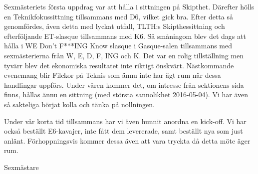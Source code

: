 \documentclass[../_main/handlingar.tex]{subfiles}
\begin{document}
Sexmästeriets första uppdrag var att hålla i sittningen på Skipthet. Därefter hölls en Teknikfokussittning tillsammans med D6, vilket gick bra. Efter detta så genomfördes, även detta med lyckat utfall, TLTH:s Skipthessittning och efterföljande ET-slasque tillsammans med K6. Så småningom blev det dags att hålla i WE Don’t F***ING Know slasque i Gasque-salen tillsammans med sexmästerierna från W, E, D, F, ING och K. Det var en rolig tillställning men tyvärr blev det ekonomiska resultatet inte riktigt önskvärt. Nästkommande evenemang blir Filckor på Teknis som ännu inte har ägt rum när dessa handlingar uppförs. Under våren kommer det, om intresse från sektionens sida finns, hållas ännu en sittning (med största sannolikhet 2016-05-04). Vi har även så sakteliga börjat kolla och tänka på nollningen.

Under vår korta tid tillsammans har vi även hunnit anordna en kick-off. Vi har också beställt E6-kavajer, inte fått dem levererade, samt beställt nya som just anlänt. Förhoppningsvis kommer dessa även att vara tryckta då detta möte äger rum.

\begin{signatures}{1}
    \mvh
    \signature{Martin Gemborn Nilsson}{Sexmästare}
\end{signatures}
\end{document}
